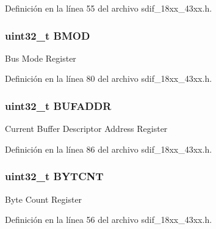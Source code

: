 Definición en la línea 55 del archivo sdif\+\_\+18xx\+\_\+43xx.\+h.

\subsubsection[{\texorpdfstring{B\+M\+OD}{BMOD}}]{ uint32\+\_\+t B\+M\+OD}\hypertarget{struct_l_p_c___s_d_m_m_c___t_af6e196654c887edf6a502dbf36c01157}{}\label{struct_l_p_c___s_d_m_m_c___t_af6e196654c887edf6a502dbf36c01157}
Bus Mode Register 

Definición en la línea 80 del archivo sdif\+\_\+18xx\+\_\+43xx.\+h.

\subsubsection[{\texorpdfstring{B\+U\+F\+A\+D\+DR}{BUFADDR}}]{ uint32\+\_\+t B\+U\+F\+A\+D\+DR}\hypertarget{struct_l_p_c___s_d_m_m_c___t_a1d7e5707436c3634e5bd9f4b5469cdc1}{}\label{struct_l_p_c___s_d_m_m_c___t_a1d7e5707436c3634e5bd9f4b5469cdc1}
Current Buffer Descriptor Address Register 

Definición en la línea 86 del archivo sdif\+\_\+18xx\+\_\+43xx.\+h.

\subsubsection[{\texorpdfstring{B\+Y\+T\+C\+NT}{BYTCNT}}]{ uint32\+\_\+t B\+Y\+T\+C\+NT}\hypertarget{struct_l_p_c___s_d_m_m_c___t_aaf40f4883242631b66579aa45436938c}{}\label{struct_l_p_c___s_d_m_m_c___t_aaf40f4883242631b66579aa45436938c}
Byte Count Register 

Definición en la línea 56 del archivo sdif\+\_\+18xx\+\_\+43xx.\+h.

